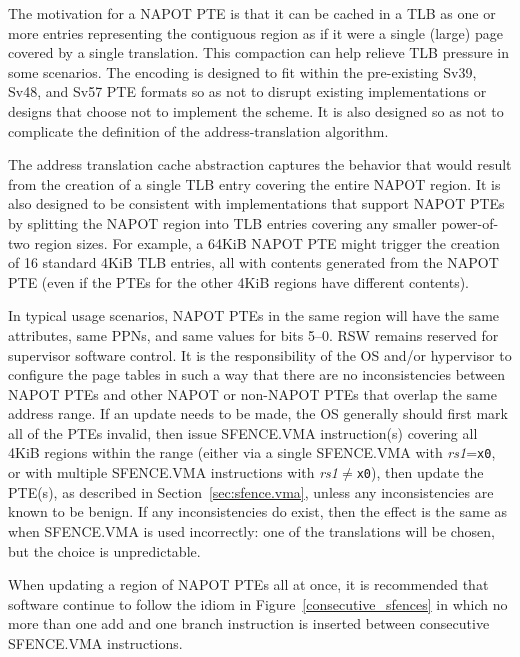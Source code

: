 \begin{commentary}
  The motivation for a NAPOT PTE is that it can be cached in a TLB as one or
  more entries representing the contiguous region as if it were a single
  (large) page covered by a single translation.  This compaction can help
  relieve TLB pressure in some scenarios.  The encoding is designed to fit
  within the pre-existing Sv39, Sv48, and Sv57 PTE formats so as not to disrupt
  existing implementations or designs that choose not to implement the scheme.
  It is also designed so as not to complicate the definition of the
  address-translation algorithm.

  The address translation cache abstraction captures the behavior that would result from the creation
  of a single TLB entry covering the entire NAPOT region.  It is also designed
  to be consistent with implementations that support NAPOT PTEs by splitting
  the NAPOT region into TLB entries covering any smaller power-of-two region
  sizes.  For example, a 64KiB NAPOT PTE might trigger the creation of 16
  standard 4KiB TLB entries, all with contents generated from the NAPOT PTE
  (even if the PTEs for the other 4KiB regions have different contents).

  In typical usage scenarios, NAPOT PTEs in the same region will have the same
  attributes, same PPNs, and same values for bits 5--0.  RSW remains reserved
  for supervisor software control.  It is the responsibility of the OS and/or
  hypervisor to configure the page tables in such a way that there are no
  inconsistencies between NAPOT PTEs and other NAPOT or non-NAPOT PTEs that
  overlap the same address range.  If an update needs to be made, the OS
  generally should first mark all of the PTEs invalid, then issue SFENCE.VMA
  instruction(s) covering all 4KiB regions within the range (either via a
  single SFENCE.VMA with {\em rs1}={\tt x0}, or with multiple SFENCE.VMA
  instructions with {\em rs1}$\neq${\tt x0}), then update the PTE(s), as
  described in Section~\ref{sec:sfence.vma}, unless any inconsistencies are
  known to be benign.  If any inconsistencies do exist, then the effect is the
  same as when SFENCE.VMA is used incorrectly: one of the translations will be
  chosen, but the choice is unpredictable.

  When updating a region of NAPOT PTEs all at once, it is recommended that
  software continue to follow the idiom in Figure~\ref{consecutive_sfences}
  in which no more than one add and one branch instruction is inserted between
  consecutive SFENCE.VMA instructions.


\end{commentary}
